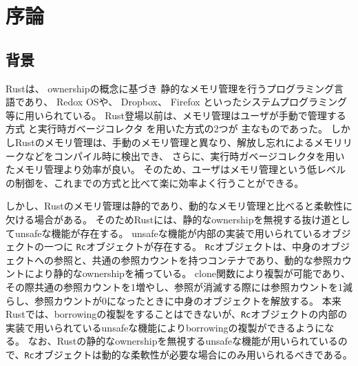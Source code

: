 \documentclass{sumiilab-paper}
\theoremstyle{mystyle}
\numberwithin{definition}{chapter} %
\begin{document}
\tableofcontents%

\mainmatter%

\chapter{序論}
\section{背景}
Rust\cite{DBLP:conf/sigada/MatsakisK14, rust-web, rust-book}は、
ownership\cite{DBLP:conf/oopsla/ClarkePN98}の概念に基づき
静的なメモリ管理を行うプログラミング言語であり、
Redox OS\cite{redox}や、
Dropbox\cite{dropbox}、
Firefox\cite{fire}
といったシステムプログラミング等に用いられている\cite{rust-web}。
Rust登場以前は、メモリ管理はユーザが手動で管理する方式
\cite{c-book}
と実行時ガベージコレクタ\cite{gc-book}
を用いた方式の2つが
主なものであった。
しかしRustのメモリ管理は、手動のメモリ管理と異なり、解放し忘れによるメモリリークなどをコンパイル時に検出でき、
さらに、実行時ガベージコレクタを用いたメモリ管理より効率が良い。
そのため、ユーザはメモリ管理という低レベルの制御を、これまでの方式と比べて楽に効率よく行うことができる。

しかし、Rustのメモリ管理は静的であり、動的なメモリ管理と比べると柔軟性に欠ける場合がある。
そのためRustには、静的なownershipを無視する抜け道としてunsafeな機能が存在する。
unsafeな機能が内部の実装で用いられているオブジェクトの一つに
\texttt{Rc}オブジェクト\cite{rc}が存在する。
\texttt{Rc}オブジェクトは、中身のオブジェクトへの参照と、共通の参照カウントを持つコンテナであり、動的な参照カウントにより静的なownershipを補っている。
clone関数により複製が可能であり、その際共通の参照カウントを1増やし、参照が消滅する際には参照カウントを1減らし、参照カウントが0になったときに中身のオブジェクトを解放する。
本来Rustでは、borrowingの複製をすることはできないが、\texttt{Rc}オブジェクトの内部の実装で用いられているunsafeな機能によりborrowingの複製ができるようになる。
なお、Rustの静的なownershipを無視するunsafeな機能が用いられているので、\texttt{Rc}オブジェクトは動的な柔軟性が必要な場合にのみ用いられるべきである。
\end{document}
